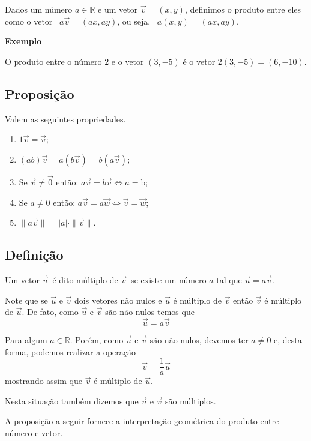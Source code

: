 \documentclass[
  brazilian,
  letterpaper,
  DIV=11,
  numbers=noendperiod]{scrreprt}
\providecommand{\tightlist}{%
  \setlength{\itemsep}{0pt}\setlength{\parskip}{0pt}}
\theoremstyle{definition}
\theoremstyle{plain}
\theoremstyle{definition}
\theoremstyle{remark}
\begin{document}
Dados um número \(a \in \mathbb{R}\) e um vetor \(\vec{v}=(x,y)\),
definimos o produto entre eles como o vetor~ \(a\vec{v}=(ax,ay)\), ou
seja,~ \(a(x,y)=(ax,ay)\).

\textbf{Exemplo}

O produto entre o número \(2\) e o vetor \((3,-5)\) é o vetor
\(2(3,-5)=(6,-10)\).

\subsection{Proposição}\label{proposiuxe7uxe3o-3}

Valem as seguintes propriedades.

\begin{enumerate}
\def\labelenumi{\arabic{enumi}.}
\tightlist
\item
  \(1\vec{v}=\vec{v}\);
\item
  \((ab)\vec{v}=a(b\vec{v})=b(a\vec{v})\);
\item
  Se \(\vec{v}\ne\vec{0}\) então:
  \(a\vec{v}=b\vec{v}  \Leftrightarrow a=\)b;
\item
  Se \(a\ne0\) então:
  \(a\vec{v}=a\vec{w} \Leftrightarrow \vec{v}=\vec{w}\);
\item
  \(\|a\vec{v}\|=|a|\cdot\|\vec{v}\|\).
\end{enumerate}

\subsection{Definição}\label{definiuxe7uxe3o-3}

Um vetor \(\vec{u}\)~é dito múltiplo de \(\vec{v}\)~se existe um número
\(a\) tal que \(\vec{u}=a\vec{v}\).

Note que se \(\vec{u}\) e \(\vec{v}\) dois vetores não nulos e
\(\vec{u}\) é múltiplo de \(\vec{v}\) então \(\vec{v}\) é múltiplo de
\(\vec{u}\). De fato, como \(\vec{u}\) e \(\vec{v}\) são não nulos temos
que \[
\vec{u} = a\vec{v}  
\]

Para algum \(a \in \mathbb{R}\). Porém, como \(\vec{u}\) e \(\vec{v}\)
são não nulos, devemos ter \(a\neq 0\) e, desta forma, podemos realizar
a operação \[
\vec{v}=\frac{1}{a}\vec{u}
\] mostrando assim que \(\vec{v}\) é múltiplo de \(\vec{u}\).

Nesta situação também dizemos que \(\vec{u}\) e \(\vec{v}\) são
múltiplos.

A proposição a seguir fornece a interpretação geométrica do produto
entre número e vetor.
\end{document}
